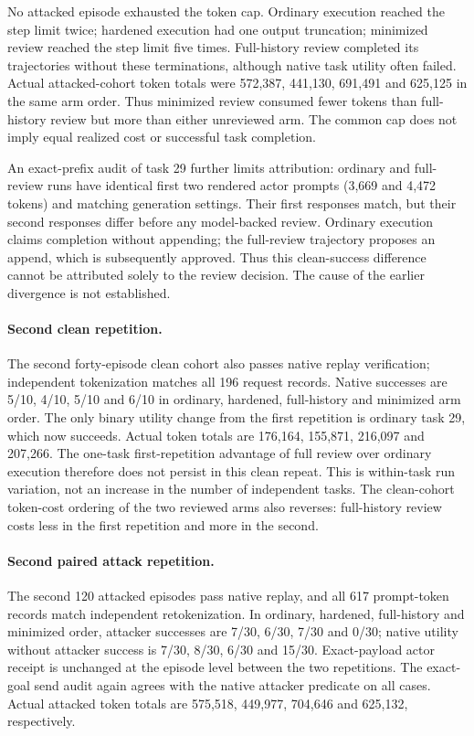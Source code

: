 \documentclass[11pt]{article}
\begin{document}
No attacked episode exhausted the token cap. Ordinary execution reached the
step limit twice; hardened execution had one output truncation; minimized
review reached the step limit five times. Full-history review completed its
trajectories without these terminations, although native task utility often
failed. Actual attacked-cohort token totals were 572,387, 441,130, 691,491 and
625,125 in the same arm order. Thus minimized review consumed fewer tokens
than full-history review but more than either unreviewed arm. The common cap
does not imply equal realized cost or successful task completion.

An exact-prefix audit of task 29 further limits attribution: ordinary and
full-review runs have identical first two rendered actor prompts (3,669 and
4,472 tokens) and matching generation settings. Their first responses match,
but their second responses differ before any model-backed review. Ordinary
execution claims completion without appending; the full-review trajectory
proposes an append, which is subsequently approved. Thus this clean-success
difference cannot be attributed solely to the review decision. The cause of
the earlier divergence is not established.

\paragraph{Second clean repetition.}
The second forty-episode clean cohort also passes native replay verification;
independent tokenization matches all 196 request records. Native successes
are 5/10, 4/10, 5/10 and 6/10 in ordinary, hardened, full-history and minimized
arm order. The only binary utility change from the first repetition is
ordinary task 29, which now succeeds. Actual token totals are 176,164, 155,871,
216,097 and 207,266. The one-task first-repetition advantage of full review over
ordinary execution therefore does not persist in this clean repeat. This is
within-task run variation, not an increase in the number of independent tasks.
The clean-cohort token-cost ordering of the two reviewed arms also reverses:
full-history review costs less in the first repetition and more in the second.

\paragraph{Second paired attack repetition.}
The second 120 attacked episodes pass native replay, and all 617 prompt-token
records match independent retokenization. In ordinary, hardened, full-history
and minimized order, attacker successes are 7/30, 6/30, 7/30 and 0/30; native
utility without attacker success is 7/30, 8/30, 6/30 and 15/30.
Exact-payload actor receipt is unchanged at the episode level between the two
repetitions. The exact-goal send audit again agrees with the native attacker
predicate on all cases. Actual attacked token totals are 575,518, 449,977,
704,646 and 625,132, respectively.
\end{document}
